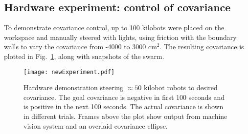 

\subsection{Hardware experiment: control of covariance}
To demonstrate covariance control, up to 100 kilobots were placed on the workspace and manually steered with lights, using friction with the boundary walls to vary the covariance from  -4000 to 3000 cm$^2$.  The resulting covariance is plotted in Fig.~\ref{fig:covExperiment}, along with snapshots of the swarm.




\begin{figure}
\begin{center}
	\texttt{[image: newExperiment.pdf]}
\end{center}
\caption{\label{fig:covExperiment}
Hardware demonstration steering $\approx 50$ kilobot robots to desired covariance. The goal covariance is negative in first 100 seconds and is positive in the next 100 seconds. The actual covariance is shown in different trials. Frames above the plot show output from machine vision system and an overlaid covariance ellipse.
}
\end{figure}


